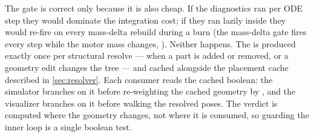 The gate is correct only because it is also cheap. If the diagnostics ran per ODE step they
would dominate the integration cost; if they ran lazily inside  they
would re-fire on every mass-delta rebuild during a burn (the mass-delta gate
 fires every step while the motor mass changes,
). Neither happens. The  is produced exactly
once per structural resolve --- when a part is added or removed, or a geometry edit changes the
tree --- and cached alongside the placement cache described in \cref{sec:resolver}. Each
consumer reads the cached boolean: the simulator branches on it before re-weighting the cached
geometry by , and the visualizer branches on it before walking the resolved
poses. The verdict is computed where the geometry changes, not where it is consumed, so guarding
the inner loop is a single boolean test.
